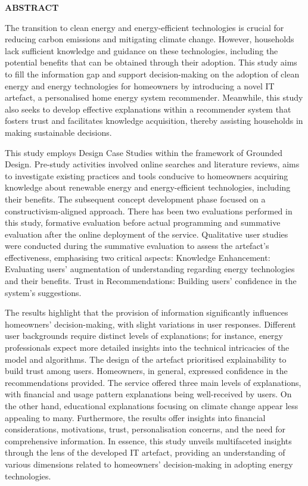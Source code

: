  \setcounter{page}{3}
\begin{center}
{\Large{\bf{ABSTRACT}}}
\end{center}

\noindent

The transition to clean energy and energy-efficient technologies is crucial for reducing carbon emissions and mitigating climate change. 
However, households lack sufficient knowledge and guidance on these technologies, including the potential benefits that can be obtained through their adoption.
This study aims to fill the information gap and support decision-making on the adoption of clean energy and energy technologies for homeowners by introducing a novel IT artefact, a personalised home energy system recommender.
Meanwhile, this study also seeks to develop effective explanations within a recommender system that fosters trust and facilitates knowledge acquisition, thereby assisting households in making sustainable decisions.

This study employs Design Case Studies within the framework of Grounded Design. 
Pre-study activities involved online searches and literature reviews,
aims to investigate existing practices and tools conducive to homeowners acquiring knowledge about renewable energy and energy-efficient technologies, including their benefits.
The subsequent concept development phase focused on a constructivism-aligned approach. 
There has been two evaluations performed in this study, formative evaluation before actual programming and summative evaluation after the online deployment of the service.
Qualitative user studies were conducted during the summative evaluation to assess the artefact's effectiveness, emphasising two critical aspects: 
Knowledge Enhancement: Evaluating users' augmentation of understanding regarding energy technologies and their benefits.
Trust in Recommendations: Building users' confidence in the system's suggestions.

The results highlight that the provision of information significantly influences homeowners' decision-making, with slight variations in user responses. 
Different user backgrounds require distinct levels of explanations; for instance, energy professionals expect more detailed insights into the technical intricacies of the model and algorithms.
The design of the artefact prioritised explainability to build trust among users. 
Homeowners, in general, expressed confidence in the recommendations provided. 
The service offered three main levels of explanations, with financial and usage pattern explanations being well-received by users. 
On the other hand, educational explanations focusing on climate change appear less appealing to many.
Furthermore, the results offer insights into financial considerations, motivations, trust, personalisation concerns, and the need for comprehensive information. 
In essence, this study unveils multifaceted insights through the lens of the developed IT artefact, providing an understanding of various dimensions related to homeowners' decision-making in adopting energy technologies.


